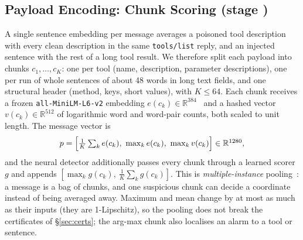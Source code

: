 \documentclass[conference,compsoc]{IEEEtran}
\newcommand{\R}{\mathbb{R}}
\begin{document}
\subsection{Payload Encoding: Chunk Scoring (stage )}
\label{sec:encoder}
A single sentence embedding per message averages a poisoned tool description with every clean description in the same \texttt{tools/list} reply, and an injected sentence with the rest of a long tool result. We therefore split each payload into chunks $c_{1},\dots,c_{K}$: one per tool (name, description, parameter descriptions), one per run of whole sentences of about 48 words in long text fields, and one structural header (method, keys, short values), with $K\le 64$. Each chunk receives a frozen \texttt{all-MiniLM-L6-v2} embedding $e(c_{k})\in\R^{384}$~\cite{Reimers2019SBERT,Wang2020MiniLM} and a hashed vector $v(c_{k})\in\R^{512}$ of logarithmic word and word-pair counts, both scaled to unit length. The message vector is
\begin{equation}
p=\Bigl[\tfrac{1}{K}\textstyle\sum_{k}e(c_{k}),\ \max_{k}e(c_{k}),\ \max_{k}v(c_{k})\Bigr]\in\R^{1280},
\label{eq:pool}
\end{equation}
and the neural detector additionally passes every chunk through a learned scorer $g$ and appends $[\max_{k}g(c_{k}),\ \tfrac{1}{K}\sum_{k}g(c_{k})]$. This is \emph{multiple-instance} pooling~\cite{Dietterich1997MIL,Ilse2018AttnMIL}: a message is a bag of chunks, and one suspicious chunk can decide a coordinate instead of being averaged away. Maximum and mean change by at most as much as their inputs (they are 1-Lipschitz), so the pooling does not break the certificates of \S\ref{sec:certs}; the arg-max chunk also localises an alarm to a tool or sentence.
\end{document}
